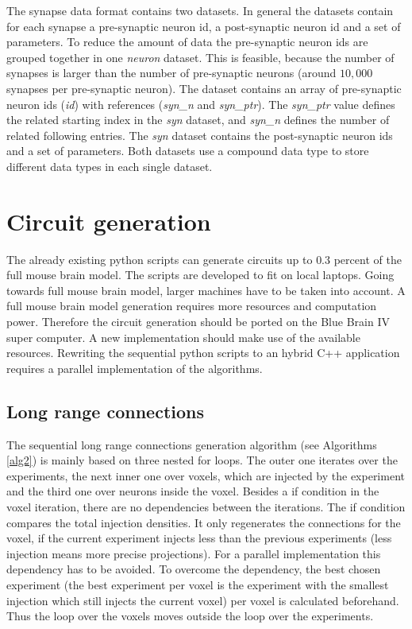 The synapse data format contains two datasets. In general the datasets contain for each synapse
a pre-synaptic neuron id, a post-synaptic neuron id and a set of parameters.
To reduce the amount of data the pre-synaptic neuron ids are grouped together in one \emph{neuron} dataset.
This is feasible, because
the number of synapses is larger than the number of pre-synaptic neurons (around $10,000$ synapses per pre-synaptic neuron).
The dataset contains an array of  pre-synaptic neuron ids (\emph{id}) with references (\emph{syn\_n} and \emph{syn\_ptr}).
The \emph{syn\_ptr} value defines the related starting index in the \emph{syn} dataset,
and \emph{syn\_n} defines the number of related following entries.
The \emph{syn} dataset contains the post-synaptic neuron ids and a set of parameters.
Both datasets use a compound data type to store different data types in each single dataset.


\section{Circuit generation}
The already existing python scripts can generate circuits up to $0.3$ percent of the full mouse brain model.
The scripts are developed to fit on local laptops.
Going towards full mouse brain model, larger machines have to be taken into account.
A full mouse brain model generation requires more resources and computation power.
Therefore the circuit generation should be ported on the Blue Brain IV super computer.
A new implementation should make use of the available resources.
Rewriting the sequential python scripts to an hybrid C++ application requires a parallel implementation of the algorithms.




\subsection{Long range connections}

The sequential long range connections generation algorithm (see Algorithms \ref{alg2}) is mainly based on three nested for loops.
The outer one iterates over the experiments, the next inner one over voxels, which are injected by the experiment and the third
one over neurons inside the voxel.
Besides a if condition in the voxel iteration, there are no dependencies between the iterations.
The if condition compares the total injection densities.
It only regenerates the connections for the voxel, if the current
experiment injects less than the previous experiments (less injection means more precise projections).
For a parallel implementation this dependency has to be avoided.
To overcome the dependency, the best chosen experiment (the best experiment per voxel is the experiment with the smallest injection which still injects the current voxel) per voxel is calculated beforehand.
Thus the loop over the voxels moves outside the loop over the experiments.

